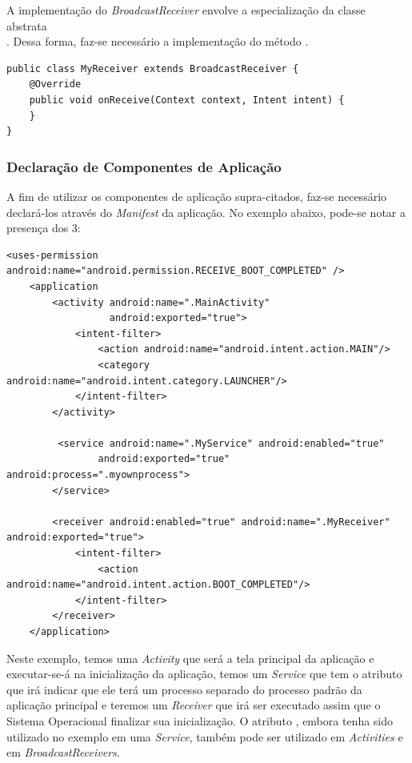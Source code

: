 \documentclass[12pt, a4paper]{article}
\newcommand{\tit}[1]{\textit{#1}}
\begin{document}
    A implementação do \tit{BroadcastReceiver} envolve a especialização da classe abstrata \\ . Dessa forma, faz-se necessário a implementação do método .\cite{android:broadcasts-overview}
        
        \begin{lstlisting}[style=Java]
public class MyReceiver extends BroadcastReceiver {
    @Override
    public void onReceive(Context context, Intent intent) {
    }
}
    \end{lstlisting}
    
    
    \subsubsection{Declaração de Componentes de Aplicação}
    A fim de utilizar os componentes de aplicação supra-citados, faz-se necessário declará-los através do \tit{Manifest} da aplicação. No exemplo abaixo, pode-se notar a presença dos 3:
    \begin{lstlisting}[style=Xml]
    <uses-permission android:name="android.permission.RECEIVE_BOOT_COMPLETED" />
    <application
        <activity android:name=".MainActivity"
                  android:exported="true">
            <intent-filter>
                <action android:name="android.intent.action.MAIN"/>
                <category android:name="android.intent.category.LAUNCHER"/>
            </intent-filter>
        </activity>
        
         <service android:name=".MyService" android:enabled="true" 
                android:exported="true" android:process=".myownprocess">
        </service>
        
        <receiver android:enabled="true" android:name=".MyReceiver" android:exported="true">
            <intent-filter>
                <action android:name="android.intent.action.BOOT_COMPLETED"/>
            </intent-filter>
        </receiver>
    </application>
    \end{lstlisting}
    Neste exemplo, temos uma \tit{Activity} que será a tela principal da aplicação e executar-se-á na inicialização da aplicação, temos um \tit{Service} que tem o atributo  que irá indicar que ele terá um processo separado do processo padrão da aplicação principal e teremos um \tit{Receiver} que irá ser executado assim que o Sistema Operacional finalizar sua inicialização.
    O atributo , embora tenha sido utilizado no exemplo em uma \tit{Service}, também pode ser utilizado em \tit{Activities} e em \tit{BroadcastReceivers}.\cite{android:activity, android:service, android:broadcasts-overview, android:activity-element, android:service-element, android:receiver-element}
    
\end{document}
